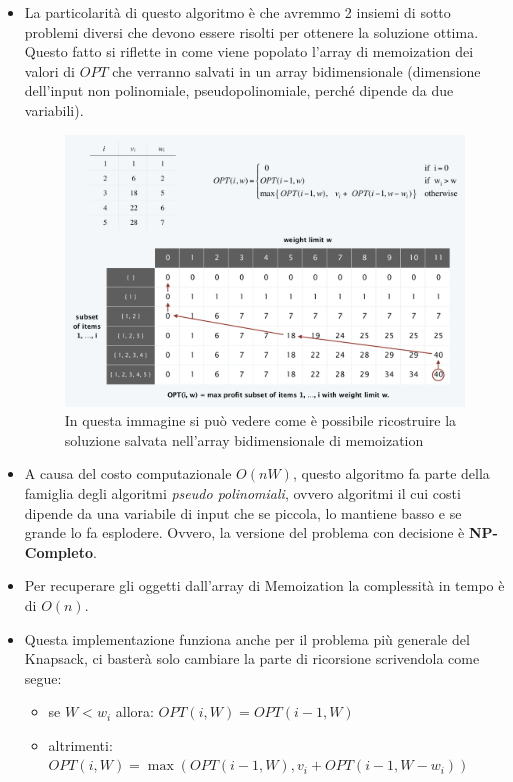 \begin{itemize}
  \item La particolarità di questo algoritmo è che avremmo 2 insiemi di sotto
        problemi diversi che devono essere risolti per ottenere la soluzione
        ottima. Questo fatto si riflette in come viene popolato l'array di
        memoization dei valori di $OPT$ che verranno salvati in un array
        bidimensionale (dimensione dell'input non polinomiale,
        pseudopolinomiale, perché dipende da due variabili).

        \begin{figure}[H]
          \includegraphics[width=13cm, keepaspectratio]{capitoli/programmazione_dinamica/imgs/zaino1.png}
          \centering
          \caption{In questa immagine si può vedere come è possibile ricostruire la soluzione
            salvata nell'array bidimensionale di memoization}
        \end{figure}

  \item A causa del costo computazionale $O(nW)$, questo algoritmo fa parte
        della famiglia degli algoritmi \emph{pseudo polinomiali}, ovvero
        algoritmi il cui costi dipende da una variabile di input che se
        piccola, lo mantiene basso e se grande lo fa esplodere. Ovvero, la
        versione del problema con decisione è \textbf{NP-Completo}.
  \item Per recuperare gli oggetti dall'array di Memoization la complessità in
        tempo è di $O(n)$.
  \item Questa implementazione funziona anche per il problema più generale del
        Knapsack, ci basterà solo cambiare la parte di ricorsione scrivendola
        come segue:\\
        \begin{myblockquote}
          \begin{itemize}
            \item se $W < w_i$ allora: $OPT(i, W) = OPT(i-1,W)$
            \item altrimenti: \linebreak $OPT(i, W) = \max(OPT(i-1, W), v_i + OPT(i-1, W-w_i))$
          \end{itemize}
        \end{myblockquote}


\end{itemize}
